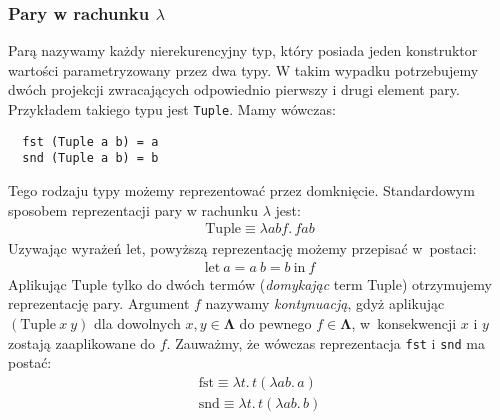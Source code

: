 \subsubsection{Pary w rachunku \(\lambda\)}\label{subsec:pairs}
Parą nazywamy każdy nierekurencyjny typ, który posiada jeden konstruktor wartości parametryzowany przez dwa typy. W takim wypadku potrzebujemy dwóch projekcji zwracających odpowiednio pierwszy i drugi element pary. Przykładem takiego typu jest \texttt{Tuple}. Mamy wówczas:
\begin{verbatim}
  fst (Tuple a b) = a
  snd (Tuple a b) = b
\end{verbatim}
Tego rodzaju typy możemy reprezentować przez domknięcie. Standardowym sposobem reprezentacji pary w rachunku \(\lambda\) jest:
\begin{align*}
  \mathrm{Tuple}\equiv\lambda a b f .\,f a b
\end{align*}
Uzywając wyrażeń let, powyższą reprezentację możemy przepisać w~postaci:
\begin{align*}
  \mathrm{let}\ a = a\ b = b\ \mathrm{in}\ f
\end{align*}
Aplikując \(\mathrm{Tuple}\) tylko do dwóch termów (\emph{domykając} term Tuple) otrzymujemy reprezentację pary. Argument \(f\) nazywamy \emph{kontynuacją}, gdyż aplikując \((\mathrm{Tuple}\ x\ y)\) dla dowolnych \(x, y\in\mathbf{\Lambda}\) do pewnego \(f\in\mathbf{\Lambda}\), w~konsekwencji \(x\) i \(y\) zostają zaaplikowane do \(f\).
Zauważmy, że wówczas reprezentacja \texttt{fst} i \texttt{snd} ma postać:
\begin{align*}
  \mathrm{fst} \equiv \lambda t.\,t(\lambda a b.\,a) \\
  \mathrm{snd} \equiv \lambda t.\,t(\lambda a b.\,b)
\end{align*}

